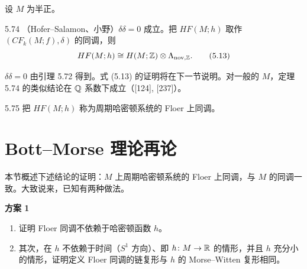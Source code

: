 
设 $M$ 为半正。

\begin{theorem}{5.74}
  （Hofer–Salamon、小野）$\delta\delta=0$ 成立。把 $HF(M;h)$ 取作 $(CF_k(M;f),\delta)$ 的同调，则
  \begin{equation}
    HF(M;h)\cong H(M;\mathbb{Z})\otimes\Lambda_{\mathrm{nov},\mathbb{Z}}. \tag{5.13}
  \end{equation}
\end{theorem}

$\delta\delta=0$ 由引理 5.72 得到。式 (5.13) 的证明将在下一节说明。对一般的 $M$，定理 5.74 的类似结论在 $\mathbb{Q}$ 系数下成立（[124], [237]）。

\begin{definition}{5.75}
  把 $HF(M;h)$ 称为周期哈密顿系统的 Floer 上同调。
\end{definition}

\section{Bott–Morse 理论再论}

本节概述下述结论的证明：$M$ 上周期哈密顿系统的 Floer 上同调，与 $M$ 的同调一致。大致说来，已知有两种做法。


\textbf{方案 1}
\begin{enumerate}[label=(\arabic*),leftmargin=2.4em,itemsep=1pt,topsep=2pt]
  \item 证明 Floer 同调不依赖于哈密顿函数 $h$。
  \item 其次，在 $h$ 不依赖于时间（$S^1$ 方向）、即 $h\colon M\to\mathbb{R}$ 的情形，并且 $h$ 充分小的情形，证明定义 Floer 同调的链复形与 $h$ 的 Morse–Witten 复形相同。
\end{enumerate}

